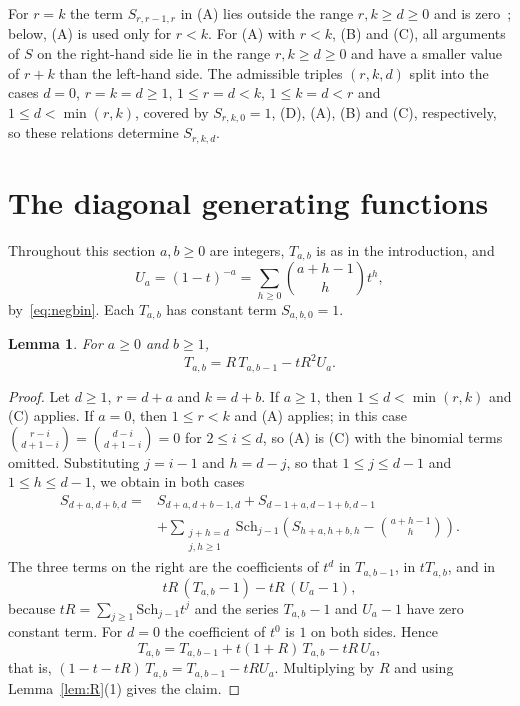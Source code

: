 \documentclass{amsart}
\newtheorem{lemma}[theorem]{Lemma}
\theoremstyle{definition}
\theoremstyle{remark}
\numberwithin{equation}{section}
\newcommand{\Sch}{\mathrm{Sch}}
\begin{document}
For $r=k$ the term $S_{r,r-1,r}$ in (A) lies outside the range $r,k\ge d\ge0$ and is zero~\cite[Section~4]{HKL}; below, (A) is used only for $r<k$. For (A) with $r<k$, (B) and (C), all arguments of $S$ on the right-hand side lie in the range $r,k\ge d\ge0$ and have a smaller value of $r+k$ than the left-hand side. The admissible triples $(r,k,d)$ split into the cases $d=0$, $r=k=d\ge1$, $1\le r=d<k$, $1\le k=d<r$ and $1\le d<\min(r,k)$, covered by $S_{r,k,0}=1$, (D), (A), (B) and (C), respectively, so these relations determine $S_{r,k,d}$.

\section{The diagonal generating functions}\label{sec:diag}

Throughout this section $a,b\ge0$ are integers, $T_{a,b}$ is as in the introduction, and
\[
U_a=(1-t)^{-a}=\sum_{h\ge0}\binom{a+h-1}{h}t^h,
\]
by~\eqref{eq:negbin}. Each $T_{a,b}$ has constant term $S_{a,b,0}=1$.

\begin{lemma}\label{lem:step}
For $a\ge0$ and $b\ge1$,
\[
T_{a,b}=R\,T_{a,b-1}-tR^2U_a.
\]
\end{lemma}

\begin{proof}
Let $d\ge1$, $r=d+a$ and $k=d+b$. If $a\ge1$, then $1\le d<\min(r,k)$ and (C) applies. If $a=0$, then $1\le r<k$ and (A) applies; in this case $\binom{r-i}{d+1-i}=\binom{d-i}{d+1-i}=0$ for $2\le i\le d$, so (A) is (C) with the binomial terms omitted. Substituting $j=i-1$ and $h=d-j$, so that $1\le j\le d-1$ and $1\le h\le d-1$, we obtain in both cases
\begin{equation}\label{eq:diagrec}
\begin{aligned}
S_{d+a,d+b,d}={}&S_{d+a,d+b-1,d}+S_{d-1+a,d-1+b,d-1}\\
&+\sum_{\substack{j+h=d\\ j,h\ge1}}\Sch_{j-1}\left(S_{h+a,h+b,h}-\binom{a+h-1}{h}\right).
\end{aligned}
\end{equation}
The three terms on the right are the coefficients of $t^d$ in $T_{a,b-1}$, in $tT_{a,b}$, and in
\[
tR\,(T_{a,b}-1)-tR\,(U_a-1),
\]
because $tR=\sum_{j\ge1}\Sch_{j-1}t^j$ and the series $T_{a,b}-1$ and $U_a-1$ have zero constant term. For $d=0$ the coefficient of $t^0$ is $1$ on both sides. Hence
\[
T_{a,b}=T_{a,b-1}+t(1+R)\,T_{a,b}-tR\,U_a,
\]
that is, $(1-t-tR)\,T_{a,b}=T_{a,b-1}-tRU_a$. Multiplying by $R$ and using Lemma~\ref{lem:R}(1) gives the claim.
\end{proof}
\end{document}
